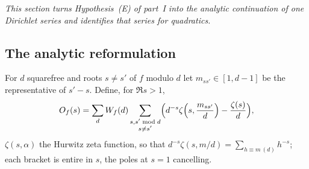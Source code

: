 \documentclass[11pt,a4paper]{article}
\theoremstyle{remark}\newtheorem{remark}[theorem]{Remark}
\begin{document}
\emph{This section turns Hypothesis~(E) of part~I into the analytic continuation of one Dirichlet series
and identifies that series for quadratics.}

\subsection{The analytic reformulation}

For $d$ squarefree and roots $s\ne s'$ of $f$ modulo $d$ let $m_{ss'}\in[1,d-1]$ be the representative of
$s'-s$. Define, for $\Re s>1$,
\begin{equation}\label{eq:Of}
O_f(s)=\sum_{d}W_f(d)\sum_{\substack{s,s'\bmod d\\ s\ne s'}}\Bigl(d^{-s}\zeta\Bigl(s,\frac{m_{ss'}}d\Bigr)-\frac{\zeta(s)}d\Bigr),
\end{equation}
$\zeta(s,\alpha)$ the Hurwitz zeta function, so that $d^{-s}\zeta(s,m/d)=\sum_{h\equiv m\ (d)}h^{-s}$; each bracket is
entire in $s$, the poles at $s=1$ cancelling.
\end{document}
